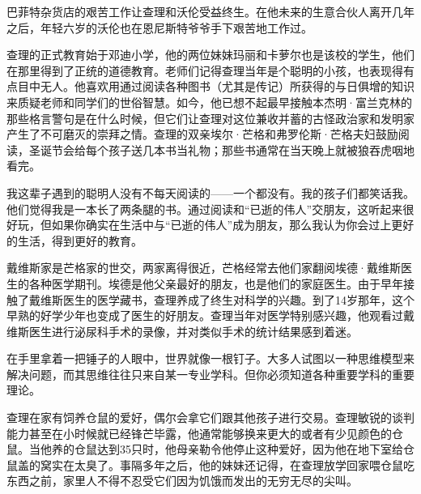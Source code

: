巴菲特杂货店的艰苦工作让查理和沃伦受益终生。在他未来的生意合伙人离开几年之后，年轻六岁的沃伦也在恩尼斯特爷爷手下艰苦地工作过。
\par

查理的正式教育始于邓迪小学，他的两位妹妹玛丽和卡萝尔也是该校的学生，他们在那里得到了正统的道德教育。老师们记得查理当年是个聪明的小孩，也表现得有点目中无人。他喜欢用通过阅读各种图书（尤其是传记）所获得的与日俱增的知识来质疑老师和同学们的世俗智慧。如今，他已想不起最早接触本杰明·富兰克林的那些格言警句是在什么时候，但它们让查理对这位兼收并蓄的古怪政治家和发明家产生了不可磨灭的崇拜之情。查理的双亲埃尔·芒格和弗罗伦斯·芒格夫妇鼓励阅读，圣诞节会给每个孩子送几本书当礼物；那些书通常在当天晚上就被狼吞虎咽地看完。
\par

\begin{WisdomBox}
\par

我这辈子遇到的聪明人没有不每天阅读的——一个都没有。我的孩子们都笑话我。他们觉得我是一本长了两条腿的书。通过阅读和“已逝的伟人”交朋友，这听起来很好玩，但如果你确实在生活中与“已逝的伟人”成为朋友，那么我认为你会过上更好的生活，得到更好的教育。
\par
\end{WisdomBox}

戴维斯家是芒格家的世交，两家离得很近，芒格经常去他们家翻阅埃德·戴维斯医生的各种医学期刊。埃德是他父亲最好的朋友，也是他们的家庭医生。由于早年接触了戴维斯医生的医学藏书，查理养成了终生对科学的兴趣。到了14岁那年，这个早熟的好学少年也变成了医生的好朋友。查理当年对医学特别感兴趣，他观看过戴维斯医生进行泌尿科手术的录像，并对类似手术的统计结果感到着迷。
\par

\begin{WisdomBox}
\par

在手里拿着一把锤子的人眼中，世界就像一根钉子。大多人试图以一种思维模型来解决问题，而其思维往往只来自某一专业学科。但你必须知道各种重要学科的重要理论。
\par
\end{WisdomBox}

查理在家有饲养仓鼠的爱好，偶尔会拿它们跟其他孩子进行交易。查理敏锐的谈判能力甚至在小时候就已经锋芒毕露，他通常能够换来更大的或者有少见颜色的仓鼠。当他养的仓鼠达到35只时，他母亲勒令他停止这种爱好，因为他在地下室给仓鼠盖的窝实在太臭了。事隔多年之后，他的妹妹还记得，在查理放学回家喂仓鼠吃东西之前，家里人不得不忍受它们因为饥饿而发出的无穷无尽的尖叫。
\par

